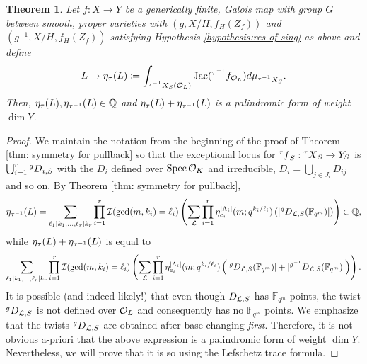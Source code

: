 \documentclass[10pt]{article}
\theoremstyle{plain}
\newtheorem{thm}[theorem]{Theorem}
\theoremstyle{definition}
\numberwithin{equation}{section}
\begin{document}
\begin{thm}\label{thm: twist symmetry under pullback}
Let $f: X \to Y$ be a generically finite, Galois map with group $G$ between \emph{smooth, proper} varieties with $(g,X/H,f_H(Z_f))$ and $(g^{-1},X/H,f_H(Z_f))$ satisfying Hypothesis \ref{hypothesis:res of sing} as above and define
\[{L} \to \eta_{\tau}({L})\coloneqq \int_{{^{\tau^{-1}} X_{S}}({{\mathcal O}_{L}})}\operatorname{Jac}({^{\tau^{-1}} f_{{\mathcal O}_{L}}})d\mu_{{^{\tau^{-1}} X_{S}}}.\]
Then, $\eta_\tau({L}), \eta_{\tau^{-1}}({L}) \in \mathbb Q$ and $\eta_{\tau}({L}) + \eta_{\tau^{-1}}({L})$ is a palindromic form of weight $\dim Y$.
\end{thm}

\begin{proof}

We maintain the notation from the beginning of the proof of Theorem \ref{thm: symmetry for pullback} so that the exceptional locus for ${^\tau f}_{S}: {^\tau X}_{S} \to Y_{S}$ is $\bigcup_{i=1}^r {^gD}_{i,S}$ with the $D_i$ defined over $\operatorname{Spec} {{\mathcal O}_{K}}$ and irreducible, $D_i = \bigcup_{j \in J_i}D_{ij}$ and so on. By Theorem \ref{thm: symmetry for pullback}, 
\[\eta_{\tau^{-1}}({L}) = \sum_{\ell_1|k_1,\dots,\ell_r|k_r}\prod_{i=1}^r{\mathcal I}(\gcd(m,k_i) = \ell_i)\left(\sum_{{\mathcal L} }\prod_{i=1}^{r}\eta_{e_i}^{|\Lambda_i|}(m;q^{k_i/\ell_i})\left(|{^gD}_{{\mathcal L},S}(\mathbb F_{q^m})|\right)\right) \in \mathbb Q,\]
while $\eta_{\tau}({L}) + \eta_{\tau^{-1}}({L})$ is equal to
\[\sum_{\ell_1|k_1,\dots,\ell_r|k_r}\prod_{i=1}^r{\mathcal I}(\gcd(m,k_i) = \ell_i)\left(\sum_{{\mathcal L} }\prod_{i=1}^{r}\eta_{e_i}^{|\Lambda_i|}(m;q^{k_i/\ell_i})\left(|{^gD}_{{\mathcal L},S}(\mathbb F_{q^m})| + |{^{g^{-1}}D}_{{\mathcal L},S}(\mathbb F_{q^m})|\right)\right).\]
It is possible (and indeed likely!) that even though $D_{{\mathcal L},S}$ has $\mathbb F_{q^m}$ points, the twist ${^gD}_{{\mathcal L},S}$ is not defined over ${{\mathcal O}_{L}}$ and consequently has no $\mathbb F_{q^m}$ points. We emphasize that the twists ${^gD}_{{\mathcal L},S}$ are obtained after base changing \emph{first}. Therefore, it is not obvious a-priori that the above expression is a palindromic form of weight $\dim Y$. Nevertheless, we will prove that it is so using the Lefschetz trace formula. 


\end{proof}
\end{document}
